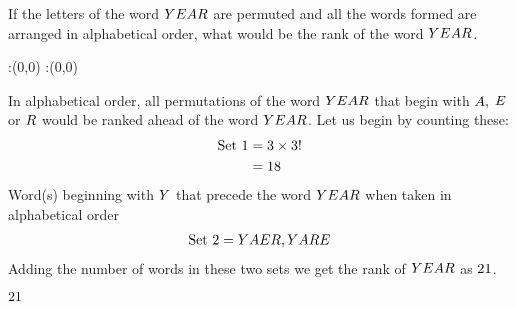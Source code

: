 


\question[3] If the letters of the word $YEAR$ are permuted and all the
 words formed are arranged in alphabetical order, what would be the rank of 
 the word $YEAR$.



\watchout

\ifprintanswers
  \begin{marginfigure}
      :(0,0)
      :(0,0)
    \figdrawbegin{}
      \figdrawline [100,101]
    \figdrawend
    \figvisu{\figBoxA}{}{%
    }
    \centerline{\box\figBoxA}
  \end{marginfigure}
\fi 

\begin{solution}[\mcq]
  In alphabetical order, all permutations of the word $YEAR$ that begin
  with $A,$ $E$ or $R$ would be ranked ahead of the word
  $YEAR$. Let us begin by counting these:
  \begin{align}
    \text{Set 1} &= 3 \times 3! \nonumber \\
                 &= 18
  \end{align}
  Word(s) beginning with $Y$ that precede the word $YEAR$ when taken
  in alphabetical order
  \begin{align}
    \text{Set 2} = YAER, YARE
  \end{align}
  Adding the number of words in these two sets we get the rank of $YEAR$ 
  as $21$.
\end{solution}

\ifprintanswers\begin{codex}$21$\end{codex}\fi
